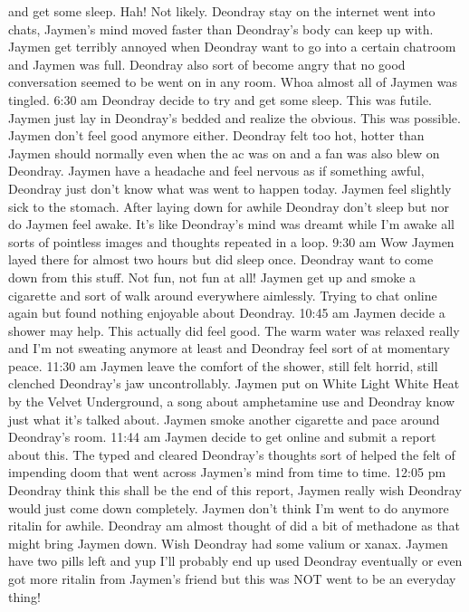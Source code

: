 \documentclass[12pt]{book}
\begin{document}
and get some sleep. Hah! Not likely. Deondray stay on the internet went into chats, Jaymen's mind moved faster than Deondray's body can keep up with. Jaymen get terribly annoyed when Deondray want to go into a certain chatroom and Jaymen was full. Deondray also sort of become angry that no good conversation seemed to be went on in any room. Whoa almost all of Jaymen was tingled. 6:30 am Deondray decide to try and get some sleep. This was futile. Jaymen just lay in Deondray's bedded and realize the obvious. This was possible. Jaymen don't feel good anymore either. Deondray felt too hot, hotter than Jaymen should normally even when the ac was on and a fan was also blew on Deondray. Jaymen have a headache and feel nervous as if something awful, Deondray just don't know what was went to happen today. Jaymen feel slightly sick to the stomach. After laying down for awhile Deondray don't sleep but nor do Jaymen feel awake. It's like Deondray's mind was dreamt while I'm awake all sorts of pointless images and thoughts repeated in a loop. 9:30 am Wow Jaymen layed there for almost two hours but did sleep once. Deondray want to come down from this stuff. Not fun, not fun at all! Jaymen get up and smoke a cigarette and sort of walk around everywhere aimlessly. Trying to chat online again but found nothing enjoyable about Deondray. 10:45 am Jaymen decide a shower may help. This actually did feel good. The warm water was relaxed really and I'm not sweating anymore at least and Deondray feel sort of at momentary peace. 11:30 am Jaymen leave the comfort of the shower, still felt horrid, still clenched Deondray's jaw uncontrollably. Jaymen put on White Light White Heat by the Velvet Underground, a song about amphetamine use and Deondray know just what it's talked about. Jaymen smoke another cigarette and pace around Deondray's room. 11:44 am Jaymen decide to get online and submit a report about this. The typed and cleared Deondray's thoughts sort of helped the felt of impending doom that went across Jaymen's mind from time to time. 12:05 pm Deondray think this shall be the end of this report, Jaymen really wish Deondray would just come down completely. Jaymen don't think I'm went to do anymore ritalin for awhile. Deondray am almost thought of did a bit of methadone as that might bring Jaymen down. Wish Deondray had some valium or xanax. Jaymen have two pills left and yup I'll probably end up used Deondray eventually or even got more ritalin from Jaymen's friend but this was NOT went to be an everyday thing!
\end{document}
